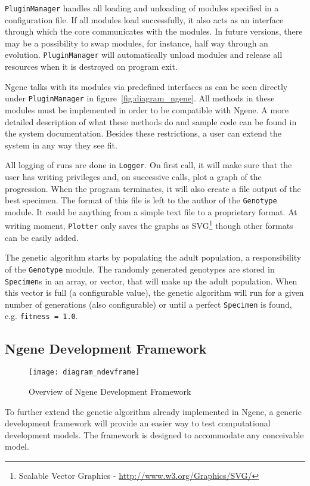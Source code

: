 \texttt{PluginManager} handles all loading and unloading of modules specified in a configuration file. If all modules load successfully, it also acts as an interface through which the core communicates with the modules. In future versions, there may be a possibility to swap modules, for instance, half way through an evolution. \texttt{PluginManager} will automatically unload modules and release all resources when it is destroyed on program exit.

Ngene talks with its modules via predefined interfaces as can be seen directly under \texttt{PluginManager} in figure~\ref{fig:diagram_ngene}. All methods in these modules must be implemented in order to be compatible with Ngene. A more detailed description of what these methods do and sample code can be found in the system documentation. Besides these restrictions, a user can extend the system in any way they see fit.

All logging of runs are done in \texttt{Logger}. On first call, it will make sure that the user has writing privileges and, on successive calls, plot a graph of the progression. When the program terminates, it will also create a file output of the best specimen. The format of this file is left to the author of the \texttt{Genotype} module. It could be anything from a simple text file to a proprietary format. At writing moment, \texttt{Plotter} only saves the graphs as SVG\footnote{Scalable Vector Graphics - \url{http://www.w3.org/Graphics/SVG/}} though other formats can be easily added.

The genetic algorithm starts by populating the adult population, a responsibility of the \texttt{Genotype} module. The randomly generated genotypes are stored in \texttt{Specimen}s in an array, or vector, that will make up the adult population. When this vector is full (a configurable value), the genetic algorithm will run for a given number of generations (also configurable) or until a perfect \texttt{Specimen} is found, e.g. \texttt{fitness = 1.0}.


\subsection{Ngene Development Framework}
\begin{figure}[!ht]
	\centering
	\texttt{[image: diagram\_ndevframe]}
	\caption{Overview of Ngene Development Framework}
	\label{fig:diagram_ndevframe}
\end{figure}

To further extend the genetic algorithm already implemented in Ngene, a generic development framework will provide an easier way to test computational development models. The framework is designed to accommodate any conceivable model.

